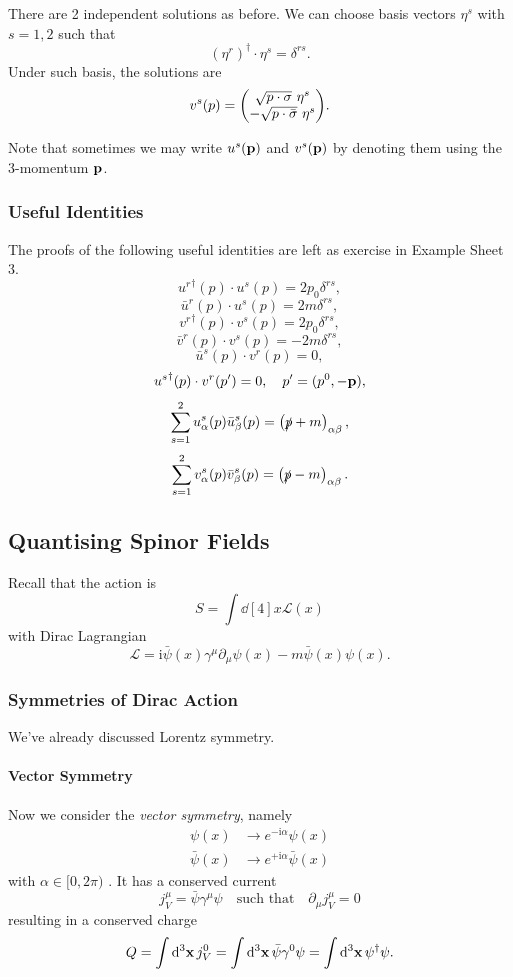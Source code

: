 \documentclass[a4paper,11pt]{article}
\begin{document}
	There are 2 independent solutions as before. We can choose basis vectors $\eta^s$ with $s = 1,2$ such that 
	\[
		(\eta^r)^{\dagger}\cdot \eta^s = \delta ^{rs}.
	\]
	Under such basis, the solutions are 
	\[
		v^s(p) = \mqty(\sqrt{p \cdot \sigma}\ \eta^s\\- \sqrt{p \cdot \bar \sigma}\ \eta^s).
	\]
	
	Note that sometimes we may write $u^s(\vb p)$ and $v^s(\vb p)$ by denoting them using the 3-momentum $\vb p$.
	
	\subsubsection{Useful Identities}

	The proofs of the following useful identities are left as exercise in Example Sheet 3.
	$${u^r}^{\dagger}(p) \cdot u^s(p) = 2p_0 \delta ^{rs},$$
	$$\bar u^r(p) \cdot u^s(p) = 2m \delta ^{rs},$$
	\[
		{v^r}^{\dagger}(p) \cdot v^s(p) = 2 p_0 \delta ^{rs},
	\]
	\[
		\bar v^r (p) \cdot v^s(p) = - 2 m \delta ^{rs},
	\]
	\[
		\bar u^s (p) \cdot v^r(p) = 0,
	\]
	\[
		{u^s}^{\dagger}(p) \cdot v^r(p') = 0, \quad p' = (p^0, - \vb p),
	\]
	\[
		\sum _{s=1}^{2} u^s_\alpha(p) \bar u^s_\beta(p) = \left( \slashed{p} + m \right)_{\alpha \beta},
	\]
	\[
		\sum _{s = 1}^2 v_\alpha^s(p)\bar v_\beta^s(p) = \left( \slashed{p} - m \right) _{\alpha \beta}.
	\]

	\subsection{Quantising Spinor Fields} 

	Recall that the action is 
	\[
		S = \int \dd[4]{x} \mathcal{L}(x)
	\]
	with Dirac Lagrangian
	\[
		\mathcal{L} = \mathrm{i} \bar \psi(x) \gamma^\mu \partial_\mu \psi(x) - m \bar \psi(x) \psi(x).
	\]
	
	\subsubsection{Symmetries of Dirac Action}

	We've already discussed Lorentz symmetry.
	
	\paragraph{Vector Symmetry} Now we consider the \emph{vector symmetry}, namely 
	\begin{align*}
		\psi(x) &\to e ^{-\mathrm{i} \alpha} \psi(x)\\
		\bar \psi(x) &\to e ^{+\mathrm{i} \alpha} \bar \psi(x)
	\end{align*}
	with $\alpha \in [0,2 \pi)$ . It has a conserved current 
	\[
		j^\mu_V = \bar \psi \gamma^\mu \psi \quad \text{such that} \quad \partial_\mu j^\mu_V = 0
	\]
	resulting in a conserved charge 
	\[
		Q = \int \dd[3]{\vb x} j^0_V = \int \dd[3]{\vb x} \bar \psi \gamma^0 \psi = \int \dd[3]{\vb x} \psi^{\dagger} \psi.
	\]
\end{document}
